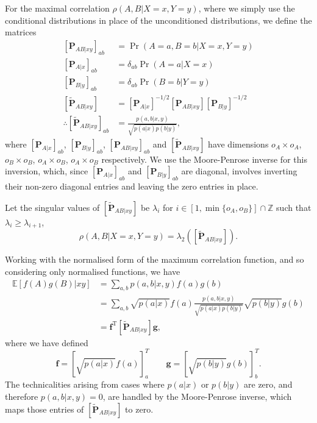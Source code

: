 \documentclass[10pt, a4paper]{article}
\newcommand{\?}{\mathrel{?}} %
\newcommand{\Z}{\mathbb{Z}} %
\newcommand{\cvec}[1]{\boldsymbol{\mathbf{#1}}}    %
\newcommand{\rvec}[1]{\boldsymbol{\mathbf{#1}}^{\mathrm{T}}} %
\newcommand{\matrp}[2]{\left[\mathbf{#1}#2\right]} %
\newcommand{\E}{\mathbb{E}} %
\numberwithin{equation}{section} %
\theoremstyle{definition}
\theoremstyle{plain}
\theoremstyle{plain}
\begin{document}
    For the maximal correlation \(\rho(A,B|X=x,Y=y)\), where we simply use the conditional distributions in place of the unconditioned distributions, we define the matrices
    \begin{align}
      \matrp{P}{_{AB|xy}}_{ab} &= \Pr(A = a, B = b|X = x, Y = y) \\
      \matrp{P}{_{A|x}}_{ab} &= \delta_{ab} \Pr(A = a|X = x) \\
      \matrp{P}{_{B|y}}_{ab} &= \delta_{ab} \Pr(B = b|Y = y) \\
      \matrp{\tilde{P}}{_{AB|xy}} &= \matrp{P}{_{A|x}}^{-1/2} \matrp{P}{_{AB|xy}} \matrp{P}{_{B|y}}^{-1/2} \\
      \therefore \matrp{\tilde{P}}{_{AB|xy}}_{ab} &= \frac{p(a,b|x,y)}{\sqrt{p(a|x)p(b|y)}},
    \end{align}
    where \(\matrp{P}{_{A|x}}_{ab}\), \(\matrp{P}{_{B|y}}_{ab}\), \(\matrp{P}{_{AB|xy}}_{ab}\) and \(\matrp{\tilde{P}}{_{AB|xy}}\) have dimensions \(o_A \times o_A\), \(o_B \times o_B\), \(o_A \times o_B\), \(o_A \times o_B\) respectively. We use the Moore-Penrose inverse for this inversion, which, since \(\matrp{P}{_{A|x}}_{ab}\) and \(\matrp{P}{_{B|y}}_{ab}\) are diagonal, involves inverting their non-zero diagonal entries and leaving the zero entries in place.

    Let the singular values of \(\matrp{\tilde{P}}{_{AB|xy}}\) be \(\lambda_i\) for \(i \in [1, \min\{o_A, o_B\}] \cap \Z\) such that \(\lambda_{i} \geq \lambda_{i+1}\),
    \begin{equation}
      \rho(A,B|X=x,Y=y) = \lambda_2\left( \matrp{\tilde{P}}{_{AB|xy}} \right).
    \end{equation}

    Working with the normalised form of the maximum correlation function, and so considering only normalised functions, we have
    \begin{align}
      \E[f(A)g(B)|xy] &= \sum_{a,b} p(a,b|x,y) f(a)g(b) \\
                      &= \sum_{a,b} \sqrt{p(a|x)} f(a) \frac{p(a,b|x,y)}{\sqrt{p(a|x)p(b|y)}} \sqrt{p(b|y)} g(b) \\
                      &= \rvec{f} \matrp{\tilde{P}}{_{AB|xy}} \cvec{g},
    \end{align}
    where we have defined
    \begin{equation}
      \cvec{f} = {[\sqrt{p(a|x)} f(a)]}^T_a \qquad \cvec{g} = {[\sqrt{p(b|y)} g(b)]}^T_b.
    \end{equation}
    The technicalities arising from cases where \(p(a|x)\) or \(p(b|y)\) are zero, and therefore \(p(a,b|x,y) = 0\), are handled by the Moore-Penrose inverse, which maps those entries of \(\matrp{\tilde{P}}{_{AB|xy}}\) to zero.
\end{document}
